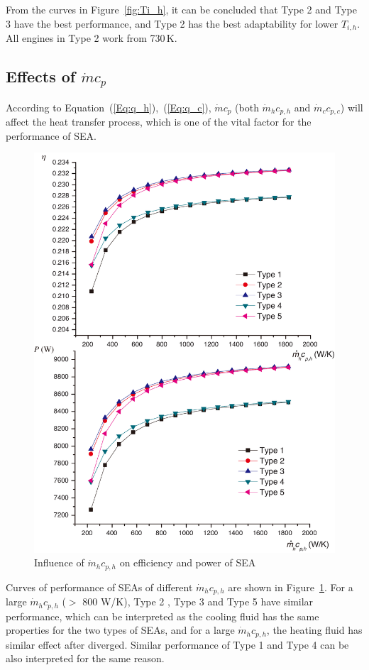 From the curves in Figure~\ref{fig:Ti_h}, it can be concluded that Type 2 and Type 3 have the best performance, and Type 2 has the best adaptability for lower $T_{i,h}$. All engines in Type 2 work from 730\,K.

\subsection{Effects of $\dot{m}c_p$}

According to Equation~(\ref{Eq:q_h}),~(\ref{Eq:q_c}), $\dot{m}c_p$ (both $\dot{m}_hc_{p,h}$ and $\dot{m}_cc_{p,c}$) will affect the heat transfer process, which is one of the vital factor for the performance of SEA.


\noindent \begin{figure}[htbp]
\begin{center}
	\includegraphics[width = 0.7\columnwidth]{fig/qm_hcp_h}
	\caption{Influence of $\dot{m}_hc_{p,h}$ on efficiency and power of SEA}
	\label{fig:qm_hcp_h}
\end{center}
\end{figure}

Curves of performance of SEAs of different $\dot{m}_hc_{p,h}$ are shown in Figure~\ref{fig:qm_hcp_h}.
For a large $\dot{m}_hc_{p,h}$ ($>$ 800 W/K), Type 2 , Type 3 and Type 5 have similar performance, which can be interpreted as the cooling fluid has the same properties for the two types of SEAs, and for a large $\dot{m}_hc_{p,h}$, the heating fluid has similar effect after diverged. Similar performance of Type 1 and Type 4 can be also interpreted for the same reason.

